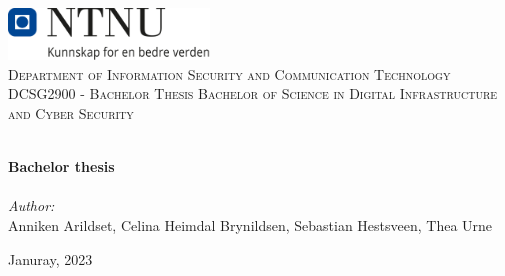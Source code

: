 \begin{titlepage}
\vbox{ }
\vbox{ }
\begin{center}
\includegraphics[width=0.40\textwidth]{Images/NTNU_logo.png}\\[1cm]
\textsc{\LARGE Department of Information Security and Communication Technology}\\[1.5cm]
\textsc{\Large DCSG2900 -  Bachelor Thesis Bachelor of Science in Digital Infrastructure and Cyber Security}\\[0.5cm]
\vbox{ }

\HRule \\[0.4cm]
{ \huge \bfseries Bachelor thesis}\\[0.4cm]
\HRule \\[1.5cm]

\large
\emph{Author:}\\
Anniken Arildset, Celina Heimdal Brynildsen, Sebastian Hestsveen, Thea Urne
\vfill

{\large Januray, 2023}
\end{center}
\end{titlepage}